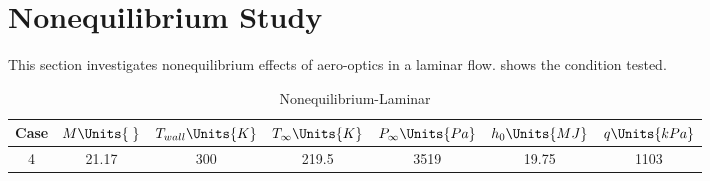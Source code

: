 \section{Nonequilibrium Study\label{ch4:nonequilibriumStudy}}

This section investigates nonequilibrium effects of aero-optics in a laminar
flow.  shows the condition tested. 

\begin{table}[H]
    \begin{center}
        \begin{tabular}{|c|c|c|c|c|c|c|}
            \hline
            Case & $M\Units{\;}$ & $T_{wall}\Units{K}$ &
            $T_{\infty}\Units{K}$ & $P_{\infty}\Units{Pa}$ &
            $h_0\Units{MJ}$ & $q\Units{kPa}$ \\
            \hline\hline
            4\cite{Eyi2019} & 21.17 & 300 &219.5 & 3519 & 19.75 & 1103 \\ \hline
        \end{tabular}
    \caption{Nonequilibrium-Laminar \label{tab:nonequilibriumStudy}}
    \end{center}
\end{table}

